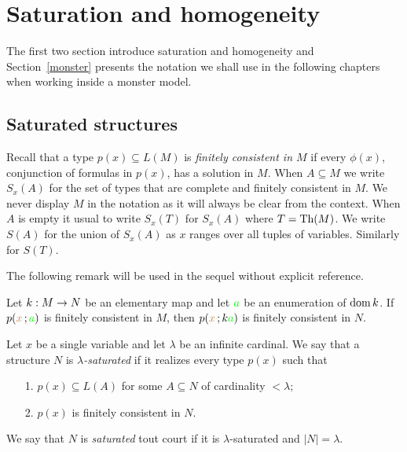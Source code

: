 \documentclass[creche.tex]{subfiles}
\begin{document}
\chapter{Saturation and homogeneity}
\label{saturation}
 
\def\medrel#1{\parbox[t]{6ex}{$\displaystyle\hfil #1$}}
\def\ceq#1#2#3{\parbox{25ex}{$\displaystyle #1$}\medrel{#2}$\displaystyle  #3$}

The first two section introduce saturation and homogeneity and Section~\ref{monster} presents the notation we shall use in the following chapters when working inside a monster model.



\section{Saturated structures}

Recall that a type $p(x)\subseteq L(M)$ is \emph{finitely consistent in $M$\/} if every $\phi(x)$, conjunction of formulas in $p(x)$, has a solution in $M$. When $A\subseteq M$ we write $S_x(A)$ for the set of types that are complete and finitely consistent in $M$. We never display $M$ in the notation as it will always be clear from the context. When $A$ is empty it usual to write $S_x(T)$ for $S_x(A)$ where $T=\textrm{Th}(M)$. We write $S(A)$ for the union of $S_x(A)$ as $x$ ranges over all tuples of variables. Similarly for $S(T)$.

The following remark will be used in the sequel without explicit reference.

\begin{remark}
Let $k:M\rightarrow N$ be an elementary map and let ${\color{green} a}$ be an enumeration of $\mathop{\rm dom} k$. If $p({\color{brown} x}\,;{\color{green} a})$ is finitely consistent in $M$, then $p({\color{brown} x}\,;k{\color{green} a})$ is finitely consistent in $N$.\QED
\end{remark}

\begin{definition}
Let $x$ be a single variable and let $\lambda$ be an infinite cardinal. We say that a structure $N$ is \emph{$\lambda$-saturated} if it realizes every type $p(x)$ such that
\begin{itemize}
\item[1.]  $p(x)\subseteq L(A)$ for some $A\subseteq N$ of cardinality $<\lambda$;
\item[2.] $p(x)$ is finitely consistent in $N$.
\end{itemize}
We say that $N$ is \emph{saturated\/} tout court if it is $\lambda$-saturated and $|N|=\lambda$.
\end{definition}
\end{document}

